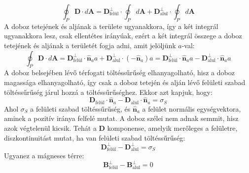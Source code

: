 \documentclass[../main.tex]{subfiles}
\begin{document}
\begin{equation}
    \oint_P \mathbf{D} \cdot d\mathbf{A} = \mathbf{D}^{\perp}_{\text{felül}} \cdot \oint_P d\mathbf{A} + \mathbf{D}^{\perp}_{\text{alul}} \cdot \oint_P d\mathbf{A}
\end{equation}
A doboz tetejének és aljának a területe ugyanakkora, így a két integrál ugyanakkora lesz, csak ellentétes irányúak, ezért a két integrál összege a doboz tetejének és aljának a területét fogja adni, amit jelöljünk $a$-val:
\begin{equation}
    \oint_P \mathbf{D} \cdot d\mathbf{A} = \mathbf{D}^{\perp}_{\text{felül}} \cdot \hat{\mathbf{n}}_a a + \mathbf{D}^{\perp}_{\text{alul}} \cdot (-\hat{\mathbf{n}}_a) a = \mathbf{D}^{\perp}_{\text{felül}} \cdot \hat{\mathbf{n}}_a a - \mathbf{D}^{\perp}_{\text{alul}} \cdot \hat{\mathbf{n}}_a a
\end{equation}
A doboz belsejében lévő térfogati töltéssűrűség elhanyagolható, hisz a doboz magassága elhanyagolható, így csak a doboz tetején és alján lévő felületi szabad töltéssűrűség járul hozzá a töltéssűrűséghez.
Ekkor azt kapjuk, hogy:
\begin{equation}
    \mathbf{D}_{\text{felül}} \cdot \hat{\mathbf{n}}_a - \mathbf{D}_{\text{alul}} \cdot \hat{\mathbf{n}}_a = \sigma_S
\end{equation}
Ahol $\sigma_S$ a felületi szabad töltéssűrűség, és $\hat{\mathbf{n}}_a$ a felület normális egységvektora, aminek a pozitív iránya felfelé mutat. A doboz szélei nem adnak semmit, hisz azok végtelenül kicsik.
Tehát a $\mathbf{D}$ komponense, amelyik merőleges a felületre, diszkontinuitást mutat, ha van felületi szabad töltéssűrűség:
\begin{equation}
   \mathbf{D}^{ \perp}_{\text{felül}} - \mathbf{D}^{ \perp}_{\text{alul}} = \sigma_S
\end{equation}
Ugyanez a mágneses térre:
\begin{equation}
    \mathbf{B}^{ \perp}_{\text{felül}} - \mathbf{B}^{ \perp}_{\text{alul}} = 0
\end{equation}
\end{document}
